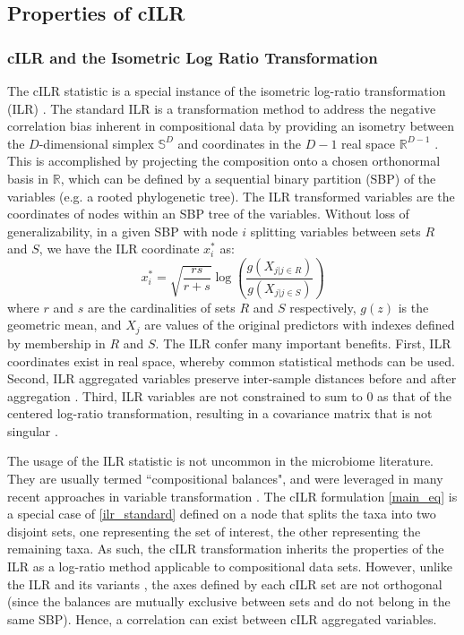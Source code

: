 \documentclass[10pt,letterpaper]{article}
\begin{document}
\subsection*{Properties of cILR}
\subsubsection*{cILR and the Isometric Log Ratio Transformation}
The cILR statistic is a special instance of the isometric log-ratio transformation (ILR) \cite{egozcue2003}. The standard ILR is a transformation method to address the negative correlation bias inherent in compositional data by providing an isometry between the $D$-dimensional simplex $\mathbb{S}^D$ and coordinates in the $D-1$ real space $\mathbb{R}^{D-1}$ \cite{egozcue2003,washburne2017}. This is accomplished by projecting the composition onto a chosen orthonormal basis in $\mathbb{R}$, which can be defined by a sequential binary partition (SBP) of the variables (e.g. a rooted phylogenetic tree). The ILR transformed variables are the coordinates of nodes within an SBP tree of the variables. Without loss of generalizability, in a given SBP with node $i$ splitting variables between sets $R$ and $S$, we have the ILR coordinate $x^{*}_{i}$ as: 
\begin{equation}\label{ilr_standard}
    x^{*}_i = \sqrt{\frac{rs}{r+s}} \log\left(\frac{g(X_{j|j \in R})}{g(X_{j|j \in S})}\right)
\end{equation}
where $r$ and $s$ are the cardinalities of sets $R$ and $S$ respectively, $g(z)$ is the geometric mean, and $X_{j}$ are values of the original predictors with indexes defined by membership in $R$ and $S$. The ILR confer many important benefits. First, ILR coordinates exist in real space, whereby common statistical methods can be used. Second, ILR aggregated variables preserve inter-sample distances before and after aggregation \cite{egozcue2005}. Third, ILR variables are not constrained to sum to 0 as that of the centered log-ratio transformation, resulting in a covariance matrix that is not singular \cite{egozcue2003}. 

The usage of the ILR statistic is not uncommon in the microbiome literature. They are usually termed ``compositional balances", and were leveraged in many recent approaches in variable transformation \cite{washburne2017,silverman2017,morton2017}. The cILR formulation \eqref{main_eq} is a special case of \eqref{ilr_standard} defined on a node that splits the taxa into two disjoint sets, one representing the set of interest, the other representing the remaining taxa. As such, the cILR transformation inherits the properties of the ILR as a log-ratio method applicable to compositional data sets. However, unlike the ILR and its variants \cite{silverman2017, morton2017, washburne2017}, the axes defined by each cILR set are not orthogonal (since the balances are mutually exclusive between sets and do not belong in the same SBP). Hence, a correlation can exist between cILR aggregated variables.  
\end{document}
